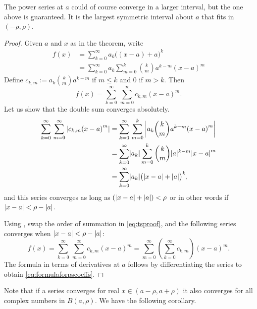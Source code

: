 The power series at $a$ could of course converge in a larger interval, but
the one above is guaranteed.  It is the largest symmetric interval about
$a$ that fits in $(-\rho,\rho)$.

\begin{proof}
Given $a$ and $x$ as in the theorem,
write
\begin{equation*}
\begin{split}
f(x) &= \sum_{k=0}^\infty a_k {\bigl((x-a)+a\bigr)}^k \\
&= \sum_{k=0}^\infty a_k \sum_{m=0}^k \binom{k}{m} a^{k-m} {(x-a)}^m %
\end{split}
\end{equation*}
Define $c_{k,m} := a_k \binom{k}{m} a^{k-m}$ if $m \leq k$ and $0$ if $m >
k$.  Then 
\begin{equation} \label{eq:tsproof}
f(x) = \sum_{k=0}^\infty \, \sum_{m=0}^\infty c_{k,m} {(x-a)}^m .
\end{equation}
Let us show that the double sum converges absolutely.
\begin{equation*}
\begin{split}
\sum_{k=0}^\infty \, \sum_{m=0}^\infty \left\lvert { c_{k,m} {(x-a)}^m} \right\rvert
& = \sum_{k=0}^\infty \, \sum_{m=0}^k \left\lvert { a_k \binom{k}{m} a^{k-m} {(x-a)}^m } \right\rvert
\\
& = \sum_{k=0}^\infty \lvert {a_k} \rvert \sum_{m=0}^k \binom{k}{m} \lvert {a} \rvert^{k-m}
{\lvert {x-a} \rvert}^m  \\
& = \sum_{k=0}^\infty \lvert {a_k} \rvert {\bigl(\lvert {x-a} \rvert+\lvert {a} \rvert\bigr)}^k ,
\end{split}
\end{equation*}
and this series converges as long as 
$(\lvert {x-a} \rvert+\lvert {a} \rvert) < \rho$ or in other words if
$\lvert {x-a} \rvert < \rho-\lvert {a} \rvert$.

Using ,
swap the order of summation in \eqref{eq:tsproof}, and 
the following series converges when $\lvert {x-a} \rvert < \rho-\lvert {a} \rvert$:
\begin{equation*}
f(x) =
\sum_{k=0}^\infty \, \sum_{m=0}^\infty c_{k,m} {(x-a)}^m
=
\sum_{m=0}^\infty
\left( \sum_{k=0}^\infty
c_{k,m} \right) {(x-a)}^m .
\end{equation*}
The formula in terms of derivatives at $a$ follows by
differentiating the series to obtain \eqref{eq:formulaforpscoeffs}.
\end{proof}

Note that if a series converges for real $x \in (a-\rho,a+\rho)$ it also converges
for all complex numbers in $B(a,\rho)$.
We have the following corollary.

